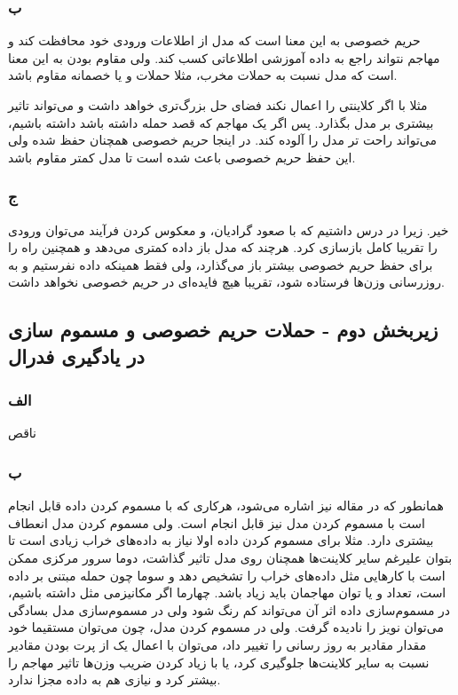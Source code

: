 \subsubsection{ب}
حریم خصوصی به این معنا است که مدل از اطلاعات ورودی خود محافظت کند و مهاجم نتواند راجع به داده آموزشی اطلاعاتی کسب کند. ولی مقاوم بودن به این معنا است که مدل نسبت به حملات مخرب، مثلا حملات 
و یا 
خصمانه مقاوم باشد.

مثلا با
اگر کلاینتی 
را اعمال نکند فضای حل بزرگ‌تری خواهد داشت و می‌تواند تاثیر بیشتری بر مدل بگذارد. پس اگر یک مهاجم که قصد حمله 
داشته باشد داشته باشیم، می‌تواند راحت تر مدل را آلوده کند. در اینجا حریم خصوصی همچنان حفظ شده ولی این حفظ حریم خصوصی باعث شده است تا مدل کمتر مقاوم باشد.

\subsubsection{ج}
خیر. زیرا در درس داشتیم که با صعود گرادیان، و معکوس کردن فرآیند 
می‌توان ورودی را تقریبا کامل بازسازی کرد. هرچند که مدل 
باز داده کمتری می‌دهد و همچنین راه را برای حفظ حریم خصوصی بیشتر باز می‌گذارد، ولی فقط همینکه داده نفرستیم و به روزرسانی وزن‌ها فرستاده شود، تقریبا هیچ فایده‌ای در حریم خصوصی نخواهد داشت.
\subsection{زیربخش دوم - حملات حریم خصوصی و مسموم سازی در یادگیری فدرال}
\subsubsection{الف}
ناقص 
\subsubsection{ب}
همانطور که در مقاله نیز اشاره می‌شود، هرکاری که با مسموم کردن داده قابل انجام است با مسموم کردن مدل نیز قابل انجام است. ولی مسموم کردن مدل انعطاف بیشتری دارد. مثلا برای مسموم کردن داده اولا نیاز به داده‌های خراب زیادی است تا بتوان علیرغم سایر کلاینت‌ها همچنان روی مدل تاثیر گذاشت، دوما سرور مرکزی ممکن است با کارهایی مثل 
داده‌های خراب را تشخیص دهد و سوما چون حمله مبتنی بر داده است، تعداد و یا توان مهاجمان باید زیاد باشد. چهارما اگر مکانیزمی مثل 
داشته باشیم، در مسموم‌سازی داده اثر آن می‌تواند کم رنگ شود ولی در مسموم‌سازی مدل بسادگی می‌توان نویز را نادیده گرفت.
ولی در مسموم کردن مدل، چون می‌توان مستقیما خود مقدار مقادیر به روز رسانی را تغییر داد، می‌توان با اعمال یک 
از پرت بودن مقادیر نسبت به سایر کلاینت‌ها جلوگیری کرد، یا با زیاد کردن ضریب وزن‌ها تاثیر مهاجم را بیشتر کرد و نیازی هم به داده مجزا ندارد.

